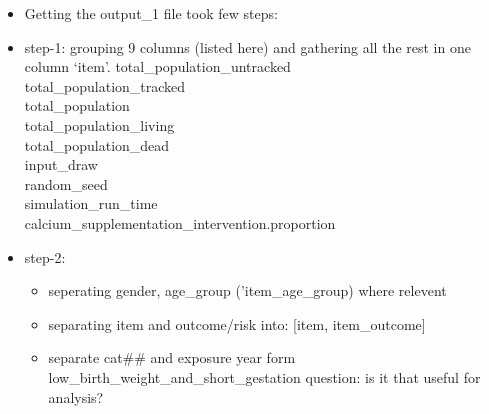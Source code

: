 \documentclass[]{article}
\providecommand{\tightlist}{%
  \setlength{\itemsep}{0pt}\setlength{\parskip}{0pt}}
\begin{document}
\begin{itemize}
\tightlist
\item
  Getting the output\_1 file took few steps:
\item
  step-1: grouping 9 columns (listed here) and gathering all the rest in
  one column `item'. total\_population\_untracked\\
  total\_population\_tracked\\
  total\_population\\
  total\_population\_living\\
  total\_population\_dead\\
  input\_draw\\
  random\_seed\\
  simulation\_run\_time\\
  calcium\_supplementation\_intervention.proportion
\item
  step-2:

  \begin{itemize}
  \tightlist
  \item
    seperating gender, age\_group ('item\_age\_group) where relevent
  \item
    separating item and outcome/risk into: {[}item, item\_outcome{]}
  \item
    separate cat\#\# and exposure year form
    low\_birth\_weight\_and\_short\_gestation question: is it that
    useful for analysis?
  \end{itemize}
\end{itemize}
\end{document}
